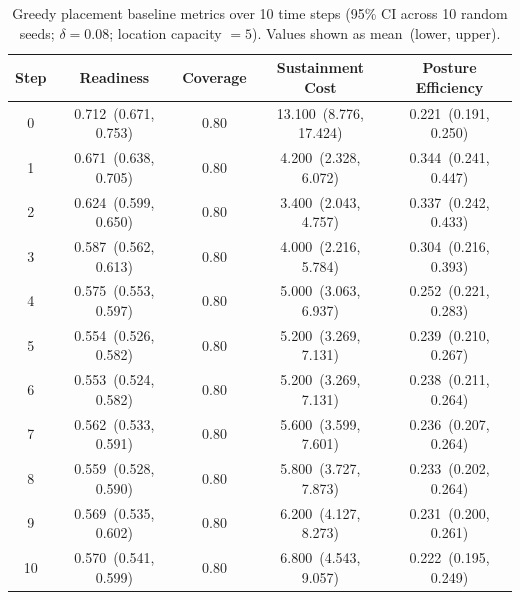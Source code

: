 \begin{table}[htbp]
\centering
\caption{Greedy placement baseline metrics over 10 time steps (95\% CI across 10 random seeds; $\delta = 0.08$; location capacity $= 5$). Values shown as mean~(lower, upper).}
\label{tab:exp1_metrics}
\begin{tabular}{ccccc}
\hline
Step & Readiness & Coverage & Sustainment Cost & Posture Efficiency \\
\hline
         0 & 0.712~(0.671, 0.753) & 0.80 & 13.100~(8.776, 17.424) & 0.221~(0.191, 0.250) \\
         1 & 0.671~(0.638, 0.705) & 0.80 & 4.200~(2.328, 6.072) & 0.344~(0.241, 0.447) \\
         2 & 0.624~(0.599, 0.650) & 0.80 & 3.400~(2.043, 4.757) & 0.337~(0.242, 0.433) \\
         3 & 0.587~(0.562, 0.613) & 0.80 & 4.000~(2.216, 5.784) & 0.304~(0.216, 0.393) \\
         4 & 0.575~(0.553, 0.597) & 0.80 & 5.000~(3.063, 6.937) & 0.252~(0.221, 0.283) \\
         5 & 0.554~(0.526, 0.582) & 0.80 & 5.200~(3.269, 7.131) & 0.239~(0.210, 0.267) \\
         6 & 0.553~(0.524, 0.582) & 0.80 & 5.200~(3.269, 7.131) & 0.238~(0.211, 0.264) \\
         7 & 0.562~(0.533, 0.591) & 0.80 & 5.600~(3.599, 7.601) & 0.236~(0.207, 0.264) \\
         8 & 0.559~(0.528, 0.590) & 0.80 & 5.800~(3.727, 7.873) & 0.233~(0.202, 0.264) \\
         9 & 0.569~(0.535, 0.602) & 0.80 & 6.200~(4.127, 8.273) & 0.231~(0.200, 0.261) \\
        10 & 0.570~(0.541, 0.599) & 0.80 & 6.800~(4.543, 9.057) & 0.222~(0.195, 0.249) \\
\hline
\end{tabular}
\end{table}